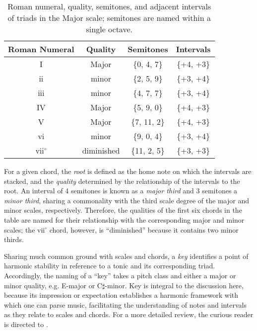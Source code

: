 \begin{table}[h!]
\begin{center}
\caption{Roman numeral, quality, semitones, and adjacent intervals of triads in the Major scale; semitones are named within a single octave.}
\label{tab:major_triads}
\begin{tabular}{c | c | c | c }
Roman Numeral & Quality & Semitones & Intervals \\
\hline
I & Major & \{0, 4, 7\} & \{+4, +3\}\\
ii & minor & \{2, 5, 9\} & \{+3, +4\}\\
iii & minor & \{4, 7, 7\} & \{+3, +4\}\\
IV & Major & \{5, 9, 0\} & \{+4, +3\}\\
V & Major & \{7, 11, 2\} & \{+4, +3\}\\
vi & minor & \{9, 0, 4\} & \{+3, +4\}\\
vii$^\circ$ & diminished & \{11, 2, 5\} & \{+3, +3\}\\
\hline
\end{tabular}
\end{center}
\end{table}

For a given chord, the \emph{root} is defined as the home note on which the intervals are stacked, and the \emph{quality} determined by the relationship of the intervals to the root.
An interval of 4 semitones is known as a \emph{major third} and 3 semitones a \emph{minor third}, sharing a commonality with the third scale degree of the major and minor scales, respectively.
Therefore, the qualities of the first six chords in the table are named for their relationship with the corresponding major and minor scales; the vii$^\circ$ chord, however, is ``diminished'' because it contains two minor thirds.

Sharing much common ground with scales and chords, a \emph{key} identifies a point of harmonic stability in reference to a tonic and its corresponding triad.
Accordingly, the naming of a ``key'' takes a pitch class and either a major or minor quality, e.g. E-major or C$\sharp$-minor.
Key is integral to the discussion here, because its impression or expectation establishes a harmonic framework with which one can parse music, facilitating the understanding of notes and intervals as they relate to scales and chords.
For a more detailed review, the curious reader is directed to \cite{Laitz2009Graduate}.


